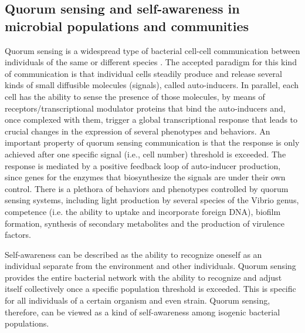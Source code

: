 \subsection{Quorum sensing and self-awareness in microbial populations and communities}
\label{section:3.4}

Quorum sensing is a widespread type of bacterial cell-cell communication between individuals of the same or different species \cite{waters_quorum_2005,lee_indole_2007,hosni_sharing_2011}. The accepted paradigm for this kind of communication is that individual cells steadily produce and release several kinds of small diffusible molecules (signals), called auto-inducers. In parallel, each cell has the ability to sense the presence of those molecules, by means of receptors/transcriptional modulator proteins that bind the auto-inducers and, once complexed with them, trigger a global transcriptional response that leads to crucial changes in the expression of several phenotypes and behaviors. An important property of quorum sensing communication is that the response is only achieved after one specific signal (i.e., cell number) threshold is exceeded. The response is mediated by a positive feedback loop of auto-inducer production, since genes for the enzymes that biosynthesize the signals are under their own control. There is a plethora of behaviors and phenotypes controlled by quorum sensing systems, including light production by several species of the Vibrio genus, competence (i.e. the ability to uptake and incorporate foreign DNA), biofilm formation, synthesis of secondary metabolites and the production of virulence factors.

Self-awareness can be described as the ability to recognize oneself as an individual separate from the environment and other individuals. Quorum sensing provides the entire bacterial network with the ability to recognize and adjust itself collectively once a specific population threshold is exceeded. This is specific for all individuals of a certain organism and even strain. Quorum sensing, therefore, can be viewed as a kind of self-awareness among isogenic bacterial populations. 

